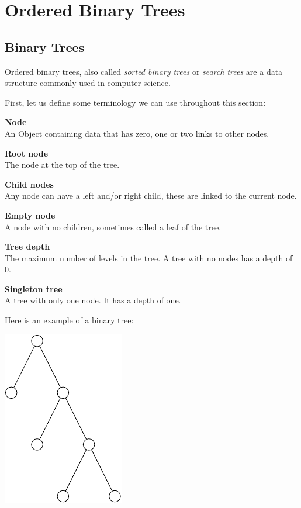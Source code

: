 
\section*{Ordered Binary Trees}

\subsection*{Binary Trees}

Ordered binary trees, also called {\it sorted binary trees} or {\it search
trees} are a data structure commonly used in computer science.

First, let us define some terminology we can use throughout this section:

\begin{description}
	\item {\bf Node}\\ 
		An Object containing data that has zero, one or two links to other nodes.
	\item {\bf Root node}\\
		The node at the top of the tree.
	\item {\bf Child nodes}\\
		Any node can have a left and/or right child, these are linked to the current node.
	\item {\bf Empty node}\\
		A node with no children, sometimes called a leaf of the tree.
	\item {\bf Tree depth}\\
		The maximum number of levels in the tree. A tree with no nodes has a depth of 0.
	\item {\bf Singleton tree}\\
		A tree with only one node. It has a depth of one.
\end{description}


Here is an example of a binary tree:

\begin{center}
	\includegraphics{trees/1.pdf}
\end{center}

